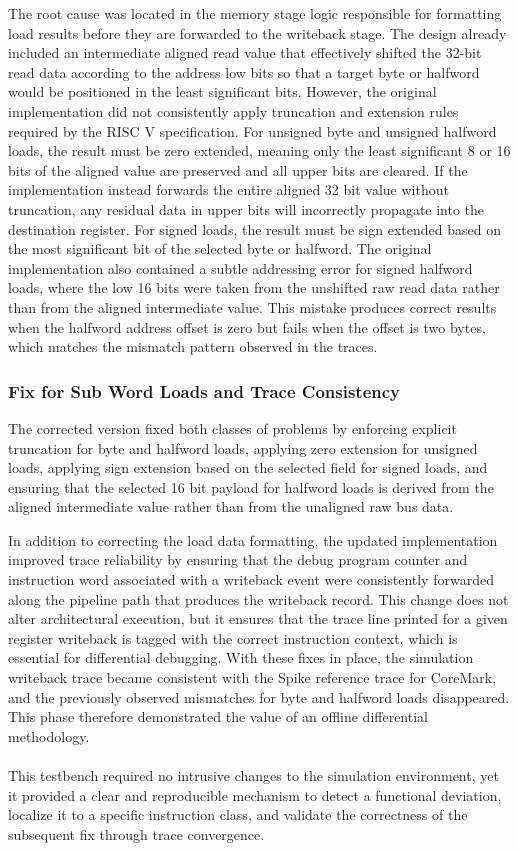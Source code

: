 \documentclass[12pt]{article}
\begin{document}
The root cause was located in the memory stage logic responsible for formatting load results before they are forwarded to the writeback stage. The design already included an intermediate aligned read value that effectively shifted the 32-bit read data according to the address low bits so that a target byte or halfword would be positioned in the least significant bits. However, the original implementation did not consistently apply truncation and extension rules required by the RISC V specification. For unsigned byte and unsigned halfword loads, the result must be zero extended, meaning only the least significant 8 or 16 bits of the aligned value are preserved and all upper bits are cleared. If the implementation instead forwards the entire aligned 32 bit value without truncation, any residual data in upper bits will incorrectly propagate into the destination register. For signed loads, the result must be sign extended based on the most significant bit of the selected byte or halfword. The original implementation also contained a subtle addressing error for signed halfword loads, where the low 16 bits were taken from the unshifted raw read data rather than from the aligned intermediate value. This mistake produces correct results when the halfword address offset is zero but fails when the offset is two bytes, which matches the mismatch pattern observed in the traces. 

\subsubsection{Fix for Sub Word Loads and Trace Consistency}
The corrected version fixed both classes of problems by enforcing explicit truncation for byte and halfword loads, applying zero extension for unsigned loads, applying sign extension based on the selected field for signed loads, and ensuring that the selected 16 bit payload for halfword loads is derived from the aligned intermediate value rather than from the unaligned raw bus data.

In addition to correcting the load data formatting, the updated implementation improved trace reliability by ensuring that the debug program counter and instruction word associated with a writeback event were consistently forwarded along the pipeline path that produces the writeback record. This change does not alter architectural execution, but it ensures that the trace line printed for a given register writeback is tagged with the correct instruction context, which is essential for differential debugging. With these fixes in place, the simulation writeback trace became consistent with the Spike reference trace for CoreMark, and the previously observed mismatches for byte and halfword loads disappeared. This phase therefore demonstrated the value of an offline differential methodology. 
\\
\\This testbench required no intrusive changes to the simulation environment, yet it provided a clear and reproducible mechanism to detect a functional deviation, localize it to a specific instruction class, and validate the correctness of the subsequent fix through trace convergence.
\end{document}
